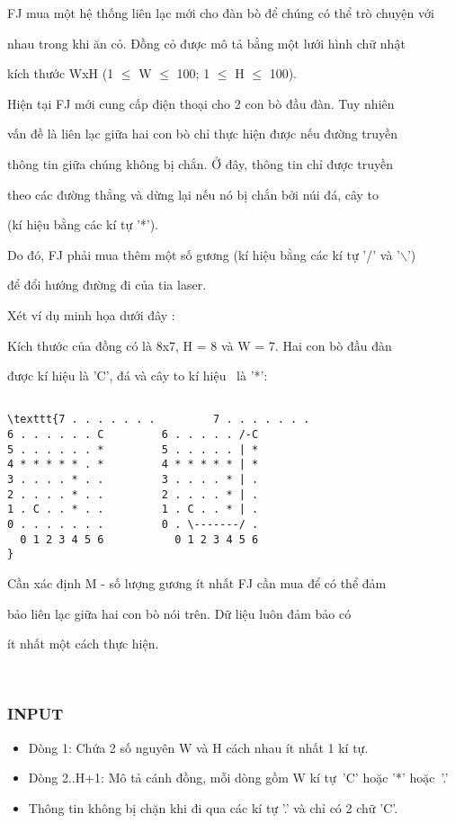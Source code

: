 

FJ mua một hệ thống liên lạc mới cho đàn bò để chúng có thể trò chuyện với


nhau trong khi ăn cỏ. Đồng cỏ được mô tả bằng một lưới hình chữ nhật


kích thước WxH (1  $\le$  W  $\le$  100; 1  $\le$  H  $\le$  100). 

Hiện tại FJ mới cung cấp điện thoại cho 2 con bò đầu đàn. Tuy nhiên


vấn đề là liên lạc giữa hai con bò chỉ thực hiện được nếu đường truyền


thông tin giữa chúng không bị chắn. Ở đây, thông tin chỉ được truyền


theo các đường thẳng và dừng lại nếu nó bị chắn bởi núi đá, cây to


(kí hiệu bằng các kí tự '*'). 

Do đó, FJ phải mua thêm một số gương (kí hiệu bằng các kí tự '/' và '$\backslash$')


để đổi hướng đường đi của tia laser.




Xét ví dụ minh họa dưới đây : 

Kích thước của đồng có là 8x7, H = 8 và W = 7. Hai con bò đầu đàn


được kí hiệu là 'C', đá và cây to kí hiệu  là '*':
\begin{verbatim}

\texttt{7 . . . . . . .         7 . . . . . . .
6 . . . . . . C         6 . . . . . /-C
5 . . . . . . *         5 . . . . . | *
4 * * * * * . *         4 * * * * * | *
3 . . . . * . .         3 . . . . * | .
2 . . . . * . .         2 . . . . * | .
1 . C . . * . .         1 . C . . * | .
0 . . . . . . .         0 . \-------/ .
  0 1 2 3 4 5 6           0 1 2 3 4 5 6
}\end{verbatim}

Cần xác định M - số lượng gương ít nhất FJ cần mua để có thể đảm


bảo liên lạc giữa hai con bò nói trên. Dữ liệu luôn đảm bảo có


ít nhất một cách thực hiện.

 

\subsubsection{INPUT}
\begin{itemize}
	\item 

Dòng 1: Chứa 2 số nguyên W và H cách nhau ít nhất 1 kí tự.
	\item 

Dòng 2..H+1: Mô tả cánh đồng, mỗi dòng gồm W kí tự 'C' hoặc '*' hoặc '.'
	\item 

Thông tin không bị chặn khi đi qua các kí tự '.' và chỉ có 2 chữ 'C'.
\end{itemize}

